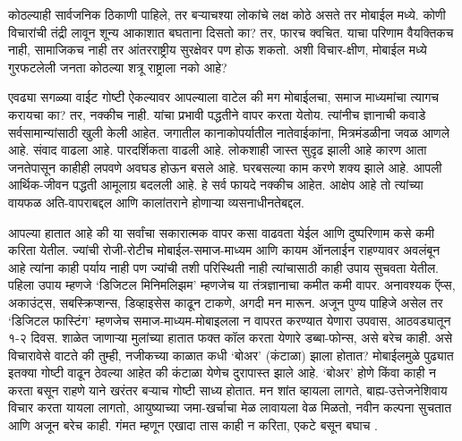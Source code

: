 कोठल्याही सार्वजनिक ठिकाणी पाहिले, तर बऱ्याचश्या लोकांचे लक्ष कोठे असते तर मोबाईल मध्ये. कोणी विचारांची तंद्री लावून शून्य आकाशात बघताना दिसतो का? तर, फारच क्वचित. याचा परिणाम वैयक्तिकच नाही, सामाजिकच नाही तर आंतरराष्ट्रीय सुरक्षेवर पण होऊ शकतो. अशी विचार-क्षीण, मोबाईल मध्ये गुरफटलेली जनता कोठल्या शत्रू राष्ट्राला नको आहे?

एवढ्या सगळ्या वाईट गोष्टी ऐकल्यावर आपल्याला वाटेल की मग मोबाईलचा, समाज माध्यमांचा त्यागच करायचा का? तर, नक्कीच नाही. यांचा प्रभावी पद्धतीने वापर करता येतोय. त्यांनीच ज्ञानाची कवाडे सर्वसामान्यांसाठी खुली केली आहेत. जगातील कानाकोपर्यातील नातेवाईकांना, मित्रमंडळीना जवळ आणले आहे. संवाद वाढला आहे. पारदर्शिकता वाढली आहे. लोकशाही जास्त सुदृढ झाली आहे कारण आता जनतेपासून काहीही लपवणे अवघड होऊन बसले आहे. घरबसल्या काम करणे शक्य झाले आहे. आपली आर्थिक-जीवन पद्धती आमूलाग्र बदलली आहे. हे सर्व फायदे नक्कीच आहेत. आक्षेप आहे तो त्यांच्या वायफळ अति-वापराबद्दल आणि कालांतराने होणाऱ्या व्यसनाधीनतेबद्दल.

आपल्या हातात आहे की या सर्वांचा सकारात्मक वापर कसा वाढवता येईल आणि दुष्परिणाम कसे कमी करिता येतील. ज्यांची रोजी-रोटीच मोबाईल-समाज-माध्यम आणि कायम ऑनलाईन राहण्यावर अवलंबून आहे त्यांना काही पर्याय नाही पण ज्यांची तशी परिस्थिती नाही त्यांचासाठी काही उपाय सुचवता येतील. पहिला उपाय म्हणजे `डिजिटल मिनिमलिझम' म्हणजेच या तंत्रज्ञानाचा कमीत कमी वापर. अनावश्यक ऍप्स, अकाउंट्स, सबस्क्रिप्शन्स, डिव्हाइसेस काढून टाकणे, अगदी मन मारून. अजून पुण्य पाहिजे असेल तर `डिजिटल फास्टिंग' म्हणजेच समाज-माध्यम-मोबाइलला न वापरत करण्यात येणारा उपवास, आठवड्यातून १-२ दिवस. शाळेत जाणाऱ्या मुलांच्या हातात फक्त कॉल करता येणारे डब्बा-फोन्स, असे बरेच काही. असे विचारावेसे वाटते की तुम्ही, नजीकच्या काळात कधी `बोअर' (कंटाळा) झाला होतात? मोबाईलमुळे पुढ्यात इतक्या गोष्टी वाढून ठेवल्या आहेत की कंटाळा येणेच दुरापास्त झाले आहे. `बोअर' होणे किंवा काही न करता बसून राहणे याने खरंतर बऱ्याच गोष्टी साध्य होतात. मन शांत व्हायला लागते, बाह्य-उत्तेजनेशिवाय विचार करता यायला लागतो, आयुष्याच्या जमा-खर्चाचा मेळ लावायला वेळ मिळतो, नवीन कल्पना सुचतात आणि अजून बरेच काही. गंमत म्हणून एखादा तास काही न करिता, एकटे बसून बघाच .